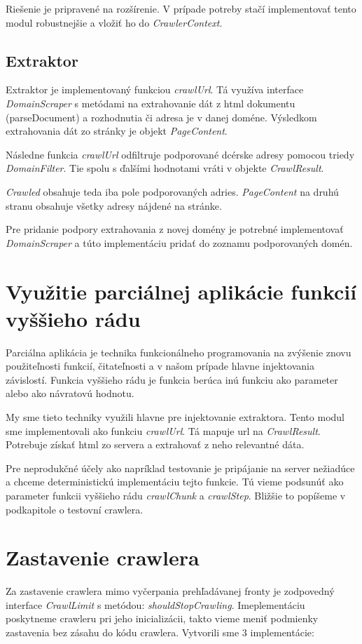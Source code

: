 Riešenie je pripravené na rozšírenie. V prípade potreby stačí implementovať tento modul robustnejšie a vložiť ho do \textit{CrawlerContext}. 

\subsection{Extraktor}
Extraktor je implementovaný funkciou \textit{crawlUrl}. Tá využíva interface \textit{DomainScraper} s metódami na extrahovanie dát z html  dokumentu (parseDocument) a rozhodnutia či adresa je v danej doméne. Výsledkom extrahovania dát zo stránky je objekt \textit{PageContent}. 

Následne funkcia \textit{crawlUrl} odfiltruje podporované dcérske adresy pomocou triedy \textit{DomainFilter}. Tie spolu s ďalšími hodnotami vráti v objekte \textit{CrawlResult}. 

\textit{Crawled} obsahuje teda iba pole podporovaných adries. \textit{PageContent} na druhú stranu obsahuje všetky adresy nájdené na stránke. 

Pre pridanie podpory extrahovania z novej domény je potrebné implementovať \textit{DomainScraper} a túto implementáciu pridať do zoznamu podporovaných domén. 


\section{Využitie parciálnej aplikácie funkcií vyššieho rádu}
Parciálna aplikácia je technika funkcionálneho programovania na zvýšenie znovu použiteľnosti funkcií, čitateľnosti a v našom prípade hlavne injektovania závislostí. Funkcia vyššieho rádu je funkcia berúca inú funkciu ako parameter alebo ako návratovú hodnotu. 

My sme tieto techniky využili hlavne pre injektovanie extraktora. Tento modul sme implementovali ako funkciu \textit{crawlUrl}. Tá mapuje url na \textit{CrawlResult}. Potrebuje získať html zo servera a extrahovať z neho relevantné dáta. 

Pre neprodukčné účely ako napríklad testovanie je pripájanie na server nežiadúce a chceme deterministickú implementáciu tejto funkcie. Tú vieme podsunúť ako parameter funkcii vyššieho rádu \textit{crawlChunk} a \textit{crawlStep}. Bližšie to popíšeme v podkapitole o testovní crawlera. 

\section{Zastavenie crawlera} \label{c:stopCrawling}
Za zastavenie crawlera mimo vyčerpania prehľadávanej fronty je zodpovedný interface \textit{CrawlLimit} s metódou: \textit{shouldStopCrawling}. Imeplementáciu poskytneme crawleru pri jeho inicializácii, takto vieme meniť podmienky zastavenia bez zásahu do kódu crawlera. Vytvorili sme 3 implementácie: 

